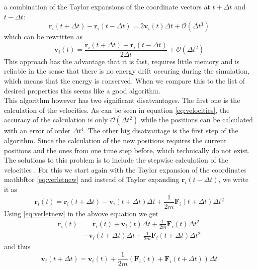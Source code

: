 \documentclass[12pt]{article}
\begin{document}
a combination of the Taylor expansions of the coordinate vectors at $t+\Delta t$ and $t-\Delta t$:
\begin{equation}
    \mathbf{r}_i(t+\Delta t) - \mathbf{r}_i(t-\Delta t) = 2\mathbf{v}_i(t)\Delta t + \mathcal{O}(\Delta t^3)
\end{equation}
which can be rewritten as
\begin{equation}
    \label{eq:velocities}
    \mathbf{v}_i(t) = \frac{\mathbf{r}_i(t+\Delta t) - \mathbf{r}_i(t-\Delta t)}{2\Delta t} + \mathcal{O}(\Delta t^2)
\end{equation}
This approach has the advantage that it is fast, requires little memory and is reliable in the sense that there is no energy drift occuring during the
simulation, which means that the energy is conserved. When we compare this to the list of desired properties this seems like a good algorithm.\\
This algorithm however has two significant disatvantages. The first one is the calculation of the velocities. As can be seen in equation
\eqref{eq:velocities}, the accuracy of the calculation is only $\mathcal{O}(\Delta t^2)$ while the positions can be calculated with an error of order
$\Delta t^4$. The other big disatvantage is the first step of the algorithm. Since the calculation of the new positions requires the current positions
and the ones from one time step before, which technically do not exist.\\
The solutions to this problem is to include the stepwise calculation of the velocities \cite{swope1982}. For this we start again with the Taylor
expansion of the coordinates mathbftor \eqref{eq:verletnew} and instead of Taylor expanding $\mathbf{r}_i(t-\Delta t)$, we write it as 
\begin{equation}
    \mathbf{r}_i(t) = \mathbf{r}_i(t+\Delta t) - \mathbf{v}_i(t+\Delta t) \Delta t + \frac1{2m} \mathbf{F}_i(t+\Delta t) \Delta t^2
\end{equation}
Using \eqref{eq:verletnew} in the abvove equation we get
\begin{equation}
    \begin{aligned}
        \mathbf{r}_i(t) &= \mathbf{r}_i(t) + \mathbf{v}_i(t) \Delta t + \frac1{2m}\mathbf{F}_i(t)\Delta t^2 \\
                     &- \mathbf{v}_i(t+\Delta t) \Delta t + \frac1{2m} \mathbf{F}_i(t+\Delta t) \Delta t^2
    \end{aligned}
\end{equation}
and thus
\begin{equation}
    \label{eq:vvelocities}
    \mathbf{v}_i(t+\Delta t) = \mathbf{v}_i(t) + \frac1{2m} \left(\mathbf{F}_i(t) + \mathbf{F}_i(t+\Delta t)\right) \Delta t
\end{equation}
\end{document}
